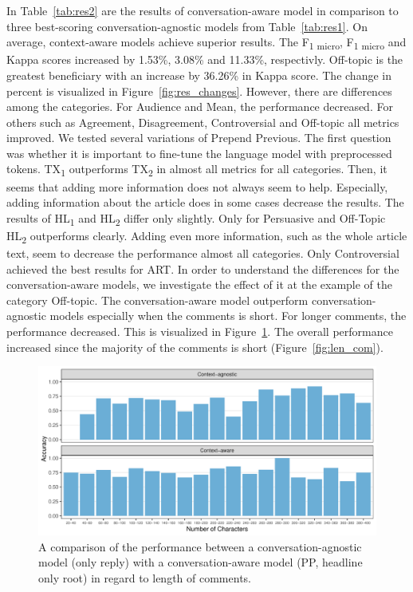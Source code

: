 In Table~\ref{tab:res2} are the results of conversation-aware model in comparison to three best-scoring conversation-agnostic models from Table~\ref{tab:res1}.
On average, context-aware models achieve superior results.
The F\textsubscript{1 micro}, F\textsubscript{1 micro} and Kappa scores increased by 1.53\%, 3.08\% and 11.33\%, respectivly.
Off-topic is the greatest beneficiary with an increase by 36.26\% in Kappa score.
The change in percent is visualized in Figure~\ref{fig:res_changes}.
However, there are differences among the categories.
For Audience and Mean, the performance decreased.
For others such as Agreement, Disagreement, Controversial and Off-topic all metrics improved.
We tested several variations of Prepend Previous.
The first question was whether it is important to fine-tune the language model with preprocessed tokens.
TX\textsubscript{1} outperforms TX\textsubscript{2} in almost all metrics for all categories.
Then, it seems that adding more information does not always seem to help.
Especially, adding information about the article does in some cases decrease the results.
The results of HL\textsubscript{1} and HL\textsubscript{2} differ only slightly.
Only for Persuasive and Off-Topic HL\textsubscript{2} outperforms clearly.
Adding even more information, such as the whole article text, seem to decrease the performance almost all categories.
Only Controversial achieved the best results for ART.
In order to understand the differences for the conversation-aware models, we investigate the effect of it at the example of the category Off-topic.
The conversation-aware model outperform conversation-agnostic models especially when the comments is short. For longer comments, the performance decreased. This is visualized in Figure~\ref{fig:exp_acc_len}. The overall performance increased since the majority of the comments is short (Figure~\ref{fig:len_com}).

\begin{figure}
  \begin{center}
    \includegraphics[width=1\textwidth]{graphs/experiments/length_acc.pdf}
  \end{center}
  \caption{A comparison of the performance between a conversation-agnostic model (only reply) with a conversation-aware model (PP, headline only root) in regard to length of comments.}
   \label{fig:exp_acc_len}
\end{figure}


